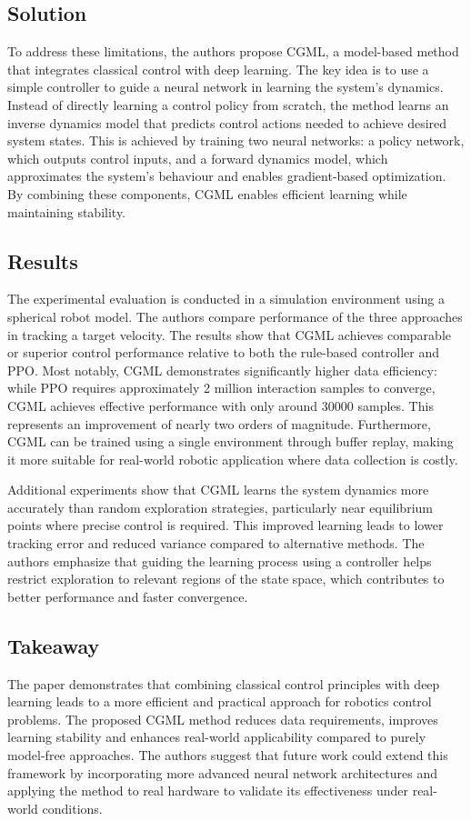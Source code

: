 \documentclass{article}
\begin{document}
\subsection{Solution}
To address these limitations, the authors propose CGML, a model-based method that integrates classical control with deep learning. The key idea is to use a simple controller to guide a neural network in learning the system's dynamics. Instead of directly learning a control policy from scratch, the method learns an inverse dynamics model that predicts control actions needed to achieve desired system states. This is achieved by training two neural networks: a policy network, which outputs control inputs, and a forward dynamics model, which approximates the system's behaviour and enables gradient-based optimization. By combining these components, CGML enables efficient learning while maintaining stability.

\subsection{Results}
The experimental evaluation is conducted in a simulation environment using a spherical robot model. The authors compare performance of the three approaches in tracking a target velocity. The results show that CGML achieves comparable or superior control performance relative to both the rule-based controller and PPO. Most notably, CGML demonstrates significantly higher data efficiency: while PPO requires approximately 2 million interaction samples to converge, CGML achieves effective performance with only around 30000 samples. This represents an improvement of nearly two orders of magnitude. Furthermore, CGML can be trained using a single environment through buffer replay, making it more suitable for real-world robotic application where data collection is costly.\vspace{8pt}

\noindent Additional experiments show that CGML learns the system dynamics more accurately than random exploration strategies, particularly near equilibrium points where precise control is required. This improved learning leads to lower tracking error and reduced variance compared to alternative methods. The authors emphasize that guiding the learning process using a controller helps restrict exploration to relevant regions of the state space, which contributes to better performance and faster convergence.

\subsection{Takeaway}
The paper demonstrates that combining classical control principles with deep learning leads to a more efficient and practical approach for robotics control problems. The proposed CGML method reduces data requirements, improves learning stability and enhances real-world applicability compared to purely model-free approaches. The authors suggest that future work could extend this framework by incorporating more advanced neural network architectures and applying the method to real hardware to validate its effectiveness under real-world conditions.



\end{document}
